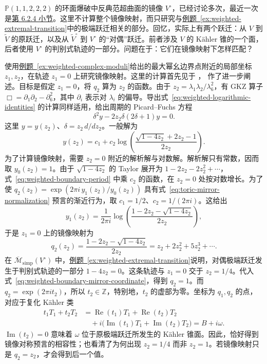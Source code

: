 \begin{example}\label{ex:weighted-boundary-mirror-map}
$\mathbb P(1,1,2,2,2)$ 的环面爆破中反典范超曲面的镜像 $V^\circ$，已经讨论多次，最近一次是\hyperref[subsec:kahler-moduli-boundary]{第 6.2.4 小节}。这里不计算整个镜像映射，而只研究与\hyperref[ex:weighted-extremal-transition]{例题~\ref*{ex:weighted-extremal-transition}}中的极端跃迁相关的部分。回忆，实际上有两个跃迁：从 $V$ 到 $\widetilde V$ 的原跃迁，以及从 $\widetilde V^\circ$ 到 $V^\circ$ 的“对偶”跃迁。前者涉及 $V$ 的 Kähler 锥的一个面，后者使用 $V^\circ$ 的判别式轨迹的一部分。问题在于：它们在镜像映射下怎样匹配？

使用\hyperref[ex:weighted-complex-moduli]{例题~\ref*{ex:weighted-complex-moduli}}给出的最大幂幺边界点附近的局部坐标 $z_1,z_2$，在轨迹 $z_1=0$ 上研究镜像映射。这里的计算首先见于 ， 作了进一步阐述。目标是假定 $z_1=0$，将 $q_2$ 算为 $z_2$ 的函数。由于 $z_2=\lambda_1\lambda_2/\lambda_6^2$，有 GKZ 算子 $\Box=\partial_1\partial_2-\partial_6^2$，其中 $\partial_i$ 表示对 $\lambda_i$ 的偏导。导出式~\eqref{eq:weighted-logarithmic-identities} 的计算同样适用，给出周期的 Picard--Fuchs 方程
\[
\delta^2y-2z_2\delta(2\delta+1)y=0.
\]
这里 $y=y(z_2)$、$\delta=z_2\,d/dz_2$。一般解为
\begin{equation}\label{eq:weighted-boundary-period}
y(z_2)=c_1+c_2\log\left(\frac{\sqrt{1-4z_2}+2z_2-1}{2z_2}\right).
\end{equation}
为了计算镜像映射，需要 $z_2=0$ 附近的解析解与对数解。解析解只有常数，因而取 $y_0(z_2)=1$。由于 $\sqrt{1-4z_2}$ 的 Taylor 展开为 $1-2z_2-2z_2^2+\cdots$，式~\eqref{eq:weighted-boundary-period} 中乘 $c_2$ 的函数，在 $z_2=0$ 处按对数增长。为了使 $q_2(z_2)=\exp(2\pi i\,y_1(z_2)/y_0(z_2))$ 具有式~\eqref{eq:toric-mirror-normalization} 预言的渐近行为，取 $c_1=1/2$、$c_2=1/(2\pi i)$。这给出
\[
y_1(z_2)=\frac1{2\pi i}\log\left(\frac{1-2z_2-\sqrt{1-4z_2}}{2z_2}\right),
\]
于是 $z_1=0$ 上的镜像映射为
\begin{equation}\label{eq:weighted-boundary-mirror-coordinate}
q_2(z_2)=\frac{1-2z_2-\sqrt{1-4z_2}}{2z_2}
=z_2+2z_2^2+5z_2^3+\cdots.
\end{equation}
在 $\overline{\mathcal M}_{\mathrm{simp}}(V^\circ)$ 中，\hyperref[ex:weighted-extremal-transition]{例题~\ref*{ex:weighted-extremal-transition}}说明，对偶极端跃迁发生于判别式轨迹的一部分 $1-4z_2=0$。这条轨迹与 $z_1=0$ 交于 $z_2=1/4$。代入式~\eqref{eq:weighted-boundary-mirror-coordinate}，得到 $q_2=1$。而 $q_2=\exp(2\pi it_2)$，所以 $t_2\in\mathbb Z$，特别地，$t_2$ 的虚部为零。坐标为 $q_1,q_2$ 的点，对应于复化 Kähler 类
\[
\begin{aligned}
t_1T_1+t_2T_2
&=\operatorname{Re}(t_1)T_1+\operatorname{Re}(t_2)T_2\\
&\quad+i\bigl(\operatorname{Im}(t_1)T_1+\operatorname{Im}(t_2)T_2\bigr)=B+i\omega.
\end{aligned}
\]
$\operatorname{Im}(t_2)=0$ 意味着 $\omega$ 位于原极端跃迁所发生的 Kähler 锥面。因此，恰好得到镜像对称预言的相容性；也看清了为何出现 $z_2=1/4$ 而非 $z_2=1$。若镜像映射只是 $q_2=z_2$，才会得到后一个值。


\end{example}

